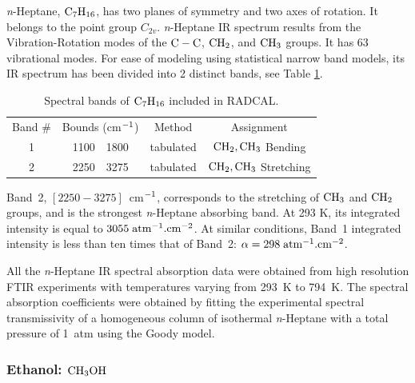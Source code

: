   \textit{n}-Heptane, $\rm C_7H_{16}$, has two planes of symmetry 
  and two axes of rotation. It belongs to the point group 
  $C_{2v}$. \textit{n}-Heptane IR spectrum results from the Vibration-Rotation
  modes of the $\rm C-C$, $\rm CH_2$, and $\rm CH_3$ groups. It has
  63 vibrational modes. For ease of modeling using 
  statistical narrow band models, its IR spectrum has
  been divided into 2 distinct bands, see Table \ref{Table::C7H16}.
  \begin{table}[ht] 
   \centering 
   \caption{Spectral bands of $\rm C_7H_{16}$ included in RADCAL.}
   \vspace{0.1in}
   \label{Table::C7H16}
   \begin{tabular}{|c|r@{-}l|c|c|} 
    \hline
    Band \# & \multicolumn{2}{|l|}{Bounds (cm$\rm ^{-1}$) } & Method & Assignment \\
    \cline{1-5}  
    1 & 1100  & 1800 & tabulated &  $\rm CH_2, CH_3$ Bending   \\
    2 & 2250  & 3275 & tabulated &  $\rm CH_2, CH_3$ Stretching \\
    \hline
   \end{tabular} 
  \end{table}
  Band~2, $\left[2250-3275\right]$~cm$\rm ^{-1}$, corresponds to the 
  stretching of $\rm CH_3$ and $\rm CH_2$ groups, and is the strongest
  \textit{n}-Heptane absorbing band.
  At 293 K, its integrated intensity is equal to $3055\;\rm {atm^{-1}.cm^{-2}}$.
  At similar conditions, Band~1 integrated intensity
  is less than ten times that of Band~2: $\alpha = 298\;\rm {atm^{-1}.cm^{-2}}$.
  
  All the \textit{n}-Heptane IR spectral absorption data were obtained from high resolution
  FTIR experiments with temperatures varying from 293~K to 794~K.
  The spectral absorption coefficients were obtained by fitting the experimental
  spectral transmissivity of a homogeneous column of isothermal \textit{n}-Heptane
  with a total pressure of 1~atm using the Goody model. 

\subsubsection{Ethanol: $\rm CH_3OH$}

